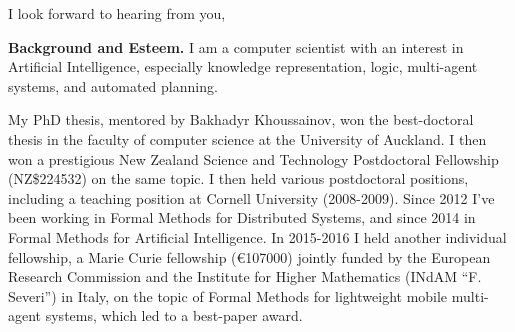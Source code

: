 \documentclass[10,a4paper,sans]{moderncv}
\begin{document}
\date{October, 2017}
\opening{\vspace{-13mm}}
\closing{I look forward to hearing from you, \vspace{-1cm}}

\makelettertitle

% 
% 




\textbf{Background and Esteem.}
I am a computer scientist with an interest in Artificial Intelligence, especially knowledge representation, logic, multi-agent systems, and automated planning. 

My PhD thesis, mentored by Bakhadyr Khoussainov, won the best-doctoral thesis in the faculty of computer science at the University of Auckland. 
I then won a prestigious New Zealand Science and Technology Postdoctoral Fellowship (NZ\$224532) on the same topic. I then held various postdoctoral positions, including a teaching position at Cornell University (2008-2009). Since 2012 I've been working in Formal Methods for Distributed Systems, and since 2014 in Formal Methods for Artificial Intelligence. 
In 2015-2016 I held another individual fellowship, a Marie Curie fellowship (\euro{107000}) jointly funded by the European Research Commission and the Institute for Higher Mathematics (INdAM ``F. Severi'') in Italy, on the topic of Formal Methods for lightweight mobile multi-agent systems, which led to a best-paper award. 
\end{document}
